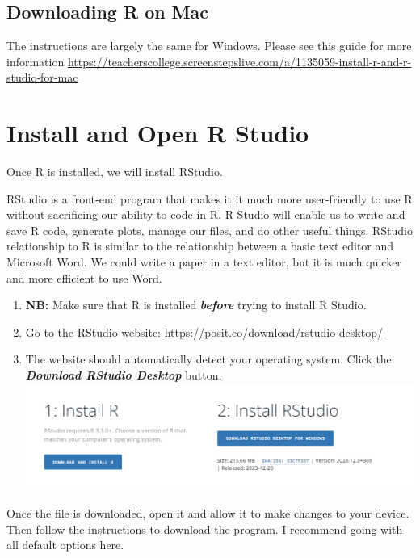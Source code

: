\documentclass[
]{book}
\providecommand{\tightlist}{%
  \setlength{\itemsep}{0pt}\setlength{\parskip}{0pt}}
\begin{document}
\hypertarget{downloading-r-on-mac}{%
\subsection{Downloading R on Mac}\label{downloading-r-on-mac}}

The instructions are largely the same for Windows. Please see this guide for more information \url{https://teacherscollege.screenstepslive.com/a/1135059-install-r-and-r-studio-for-mac}

\hypertarget{install-and-open-r-studio}{%
\section{Install and Open R Studio}\label{install-and-open-r-studio}}

Once R is installed, we will install RStudio.

RStudio is a front-end program that makes it it much more user-friendly to use R without sacrificing our ability to code in R. R Studio will enable us to write and save R code, generate plots, manage our files, and do other useful things. RStudio relationship to R is similar to the relationship between a basic text editor and Microsoft Word. We could write a paper in a text editor, but it is much quicker and more efficient to use Word.

\begin{enumerate}
\def\labelenumi{\arabic{enumi}.}
\tightlist
\item
  \textbf{NB:} Make sure that R is installed \textbf{\emph{before}} trying to install R Studio.
\item
  Go to the RStudio website: \url{https://posit.co/download/rstudio-desktop/}
\item
  The website should automatically detect your operating system. Click the \textbf{\emph{Download RStudio Desktop}} button. \includegraphics[width=7.1875in,height=\textheight]{img/01-rstudiodownload.png}
\end{enumerate}

Once the file is downloaded, open it and allow it to make changes to your device. Then follow the instructions to download the program. I recommend going with all default options here.
\end{document}
